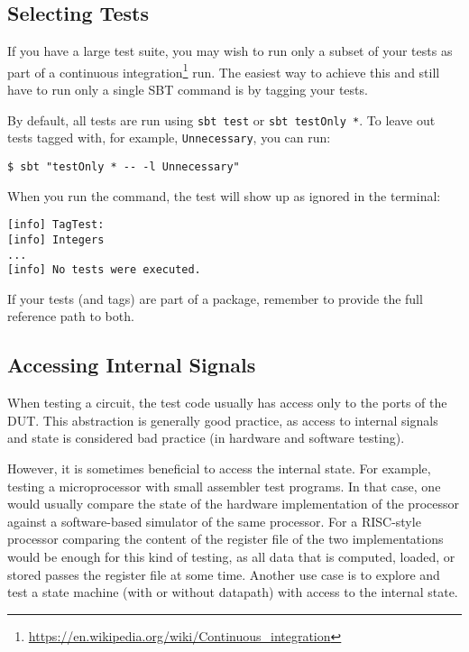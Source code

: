 \documentclass[%
    10pt,
    headinclude, footexclude,
    openright, %
    notitlepage,
    cleardoubleempty,
    headsepline,
    pointlessnumbers,
    bibtotoc, idxtotoc,
    ]{scrbook}
\newcommand{\code}[1]{{\lstinline[basicstyle=\small\ttfamily]{#1}}}
\newcommand{\myref}[2]{\href{#1}{#2}}
\renewcommand{\myref}[2]{{#2}{\footnote{\url{#1}}}}
\begin{document}
\subsection{Selecting Tests}

If you have a large test suite, you may wish to run only a subset of your tests
as part of a \myref{https://en.wikipedia.org/wiki/Continuous_integration}{continuous integration}
run. The easiest way to achieve this and still have to run only a single SBT command
is by tagging your tests.


\noindent By default, all tests are run using \code{sbt test} or \code{sbt testOnly *}.
To leave out tests tagged with, for example, \code{Unnecessary}, you can run:

\begin{verbatim}
$ sbt "testOnly * -- -l Unnecessary"
\end{verbatim}

\noindent When you run the command, the test will show up as ignored in the terminal:

\begin{verbatim}
[info] TagTest:
[info] Integers
...
[info] No tests were executed.
\end{verbatim}

If your tests (and tags) are part of a package, remember to provide the full
reference path to both.

\subsection{Accessing Internal Signals}


When testing a circuit, the test code usually has access only to the ports of the DUT.
This abstraction is generally good practice, as access to internal signals and state is considered
bad practice (in hardware and software testing).

However, it is sometimes beneficial to access the internal state. For example,
testing a microprocessor with small assembler test programs.
In that case, one would usually compare the state of the hardware implementation of
the processor against a software-based simulator of the same processor.
For a RISC-style processor comparing the content of the register file of the two implementations
would be enough for this kind of testing, as all data that is computed, loaded,
or stored passes the register file at some time.
Another use case is to explore and test a state machine (with or without datapath)
with access to the internal state.
\end{document}

